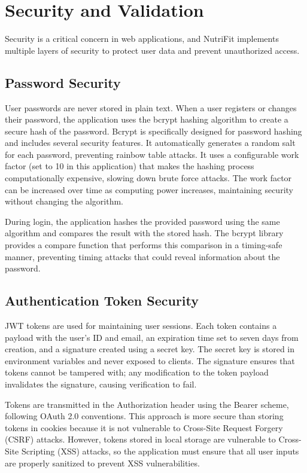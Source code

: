 \section{Security and Validation}

Security is a critical concern in web applications, and NutriFit implements multiple layers of security to protect user data and prevent unauthorized access.

\subsection{Password Security}

User passwords are never stored in plain text. When a user registers or changes their password, the application uses the bcrypt hashing algorithm to create a secure hash of the password. Bcrypt is specifically designed for password hashing and includes several security features. It automatically generates a random salt for each password, preventing rainbow table attacks. It uses a configurable work factor (set to 10 in this application) that makes the hashing process computationally expensive, slowing down brute force attacks. The work factor can be increased over time as computing power increases, maintaining security without changing the algorithm.

During login, the application hashes the provided password using the same algorithm and compares the result with the stored hash. The bcrypt library provides a compare function that performs this comparison in a timing-safe manner, preventing timing attacks that could reveal information about the password.

\subsection{Authentication Token Security}

JWT tokens are used for maintaining user sessions. Each token contains a payload with the user's ID and email, an expiration time set to seven days from creation, and a signature created using a secret key. The secret key is stored in environment variables and never exposed to clients. The signature ensures that tokens cannot be tampered with; any modification to the token payload invalidates the signature, causing verification to fail.

Tokens are transmitted in the Authorization header using the Bearer scheme, following OAuth 2.0 conventions. This approach is more secure than storing tokens in cookies because it is not vulnerable to Cross-Site Request Forgery (CSRF) attacks. However, tokens stored in local storage are vulnerable to Cross-Site Scripting (XSS) attacks, so the application must ensure that all user inputs are properly sanitized to prevent XSS vulnerabilities.

